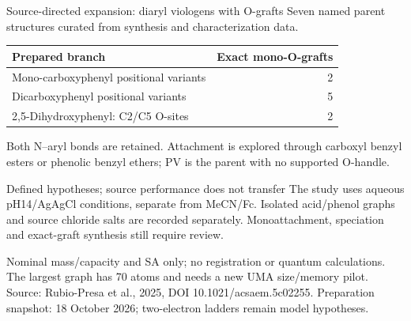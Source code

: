 \begin{frame}{Source-directed expansion: diaryl viologens with O-grafts}
\small
Seven named parent structures curated from synthesis and characterization data.
\smallskip\par\centering
\begin{tabular}{lr}
\toprule
Prepared branch & Exact mono-O-grafts \\
\midrule
Mono-carboxyphenyl positional variants & 2 \\
Dicarboxyphenyl positional variants & 5 \\
2,5-Dihydroxyphenyl: C2/C5 O-sites & 2 \\
\bottomrule
\end{tabular}\par\raggedright
\smallskip
Both N--aryl bonds are retained. Attachment is explored through carboxyl
benzyl esters or phenolic benzyl ethers; PV is the parent with no supported O-handle.
\begin{block}{Defined hypotheses; source performance does not transfer}
The study uses aqueous pH14/AgAgCl conditions, separate from MeCN/Fc.
Isolated acid/phenol graphs and source chloride salts are recorded separately.
Monoattachment, speciation and exact-graft synthesis still require review.
\end{block}
\footnotesize Nominal mass/capacity and SA only; no registration or quantum calculations.
The largest graph has 70 atoms and needs a new UMA size/memory pilot.
\vfill\scriptsize Source: Rubio-Presa et al., 2025, DOI 10.1021/acsaem.5c02255.
Preparation snapshot: 18 October 2026; two-electron ladders remain model hypotheses.
\end{frame}
